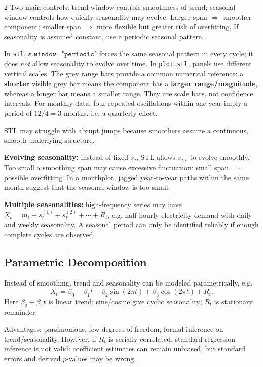 \documentclass[9pt,a4paper]{extarticle}
\newcommand{\key}[1]{\textbf{#1}}
\begin{document}
\begin{multicols}{2}
Two main controls: trend window controls smoothness of trend; seasonal window controls how quickly seasonality may evolve. Larger span \(\Rightarrow\) smoother component; smaller span \(\Rightarrow\) more flexible but greater risk of overfitting. If seasonality is assumed constant, use a periodic seasonal pattern.

In \texttt{stl}, \(\texttt{s.window="periodic"}\) forces the same seasonal pattern in every cycle; it does \emph{not} allow seasonality to evolve over time. In \texttt{plot.stl}, panels use different vertical scales. The grey range bars provide a common numerical reference: a \key{shorter} visible grey bar means the component has a \key{larger range/magnitude}, whereas a longer bar means a smaller range. They are scale bars, not confidence intervals. For monthly data, four repeated oscillations within one year imply a period of \(12/4=3\) months, i.e. a quarterly effect.

STL may struggle with abrupt jumps because smoothers assume a continuous, smooth underlying structure.

\key{Evolving seasonality:} instead of fixed \(s_j\), STL allows \(s_{j,t}\) to evolve smoothly. Too small a smoothing span may cause excessive fluctuation: small span \(\Rightarrow\) possible overfitting. In a monthplot, jagged year-to-year paths within the same month suggest that the seasonal window is too small.

\key{Multiple seasonalities:} high-frequency series may have
\(X_t=m_t+s_t^{(1)}+s_t^{(2)}+\cdots+R_t\), e.g. half-hourly electricity demand with daily and weekly seasonality. A seasonal period can only be identified reliably if enough complete cycles are observed.

\subsection{Parametric Decomposition}

Instead of smoothing, trend and seasonality can be modeled parametrically, e.g.
\[
X_t=\beta_0+\beta_1t+\beta_2\sin(2\pi t)+\beta_3\cos(2\pi t)+R_t.
\]
Here \(\beta_0+\beta_1t\) is linear trend; sine/cosine give cyclic seasonality; \(R_t\) is stationary remainder.

Advantages: parsimonious, few degrees of freedom, formal inference on trend/seasonality. However, if \(R_t\) is serially correlated, standard regression inference is not valid: coefficient estimates can remain unbiased, but standard errors and derived \(p\)-values may be wrong.


\end{multicols}
\end{document}
